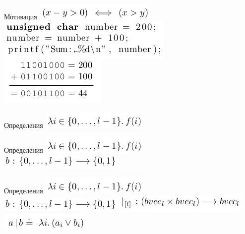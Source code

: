 \documentclass{beamer}
\begin{document}
\begin{frame}{Мотивация}
\includegraphics[scale=0.5]{mot1.png}\newline
\includegraphics[scale=0.5]{mot2.png}\newline
\includegraphics[scale=0.5]{mot3.png}
\end{frame}

\begin{frame}{Определения}
\includegraphics[scale=0.5]{lambda.png}\newline
\end{frame}

\begin{frame}{Определения}
\includegraphics[scale=0.5]{lambda.png}\newline
\includegraphics[scale=0.5]{vector.png}\newline
\end{frame}

\begin{frame}{Определения}
\includegraphics[scale=0.5]{lambda.png}\newline
\includegraphics[scale=0.5]{vector.png}\newline
\includegraphics[scale=0.5]{or1.png}\newline
\includegraphics[scale=0.5]{or2.png}\newline
\end{frame}
\end{document}
